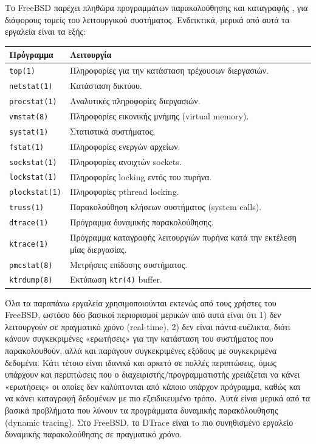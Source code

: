 \documentclass[12pt]{article}
\begin{document}
Το FreeBSD παρέχει πληθώρα προγραμμάτων παρακολούθησης και καταγραφής
\cite{fbsdjournal}, για διάφορους τομείς του λειτουργικού συστήματος.
Ενδεικτικά, μερικά από αυτά τα εργαλεία είναι τα εξής:

\begin{center}
\begin{tabular}{|l|l|}
	\hline
	\textbf{Πρόγραμμα} & \textbf{Λειτουργία} \\
	\hline
	\lstinline{top(1)} & Πληροφορίες για την κατάσταση τρέχουσων
	διεργασιών. \\
	\hline
	\lstinline{netstat(1)} & Κατάσταση δικτύου. \\
	\hline
	\lstinline{procstat(1)} & Αναλυτικές πληροφορίες διεργασιών. \\
	\hline
	\lstinline{vmstat(8)} & Πληροφορίες εικονικής μνήμης (virtual memory).
	\\
	\hline
	\lstinline{systat(1)} & Στατιστικά συστήματος. \\
	\hline
	\lstinline{fstat(1)} & Πληροφορίες ενεργών αρχείων. \\
	\hline
	\lstinline{sockstat(1)} & Πληροφορίες ανοιχτών sockets. \\
	\hline
	\lstinline{lockstat(1)} & Πληροφορίες locking εντός του πυρήνα. \\
	\hline
	\lstinline{plockstat(1)} & Πληροφορίες pthread locking. \\
	\hline
	\lstinline{truss(1)} & Παρακολούθηση κλήσεων συστήματος (system calls).
	\\
	\hline
	\lstinline{dtrace(1)} & Πρόγραμμα δυναμικής παρακολούθησης. \\
	\hline
	\lstinline{ktrace(1)} & Πρόγραμμα καταγραφής λειτουργιών πυρήνα κατά
	την εκτέλεση μίας διεργασίας. \\
	\hline
	\lstinline{pmcstat(8)} & Μετρήσεις επίδοσης συστήματος. \\
	\hline
	\lstinline{ktrdump(8)} & Εκτύπωση \lstinline{ktr(4)} buffer. \\
	\hline
\end{tabular}
\end{center}

Όλα τα παραπάνω εργαλεία χρησιμοποιούνται εκτενώς από τους χρήστες του FreeBSD,
ωστόσο δύο βασικοί περιορισμοί μερικών από αυτά είναι ότι 1) δεν λειτουργούν
σε πραγματικό χρόνο (real-time), 2) δεν είναι πάντα ευέλικτα, διότι κάνουν
συγκεκριμένες «ερωτήσεις» για την κατάσταση του συστήματος που παρακολουθούν,
αλλά και παράγουν συγκεκριμένες εξόδους με συγκεκριμένα δεδομένα. Κάτι τέτοιο
είναι ιδανικό και αρκετό σε πολλές περιπτώσεις, όμως υπάρχουν και περιπτώσεις
που ο διαχειριστής/προγραμματιστής χρειάζεται να κάνει «ερωτήσεις» οι οποίες
δεν καλύπτονται από κάποιο υπάρχον πρόγραμμα, καθώς και να κάνει καταγραφή
δεδομένων με πιο εξειδικευμένο τρόπο. Αυτά είναι μερικά από τα βασικά
προβλήματα που λύνουν τα προγράμματα δυναμικής παρακόλουθησης (dynamic
tracing). Στο FreeBSD, το DTrace είναι τo πιο συνηθισμένο εργαλείο δυναμικής
παρακολούθησης σε πραγματικό χρόνο.
\end{document}
